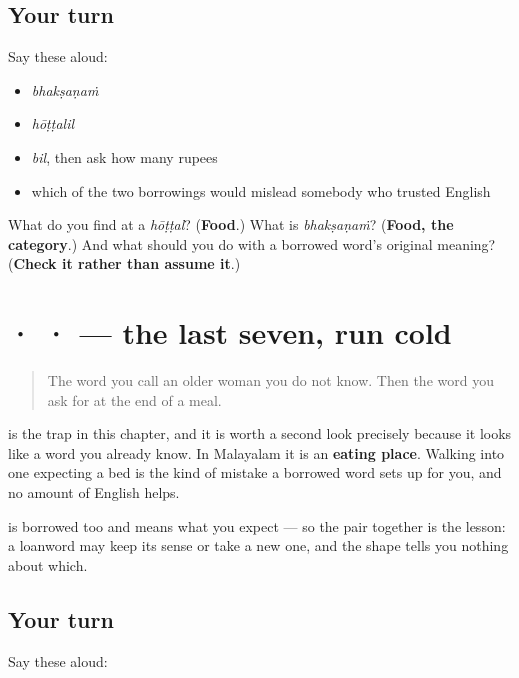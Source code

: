 \subsection*{Your turn}
Say these aloud:

\begin{itemize}
\raggedright
  \item \emph{bhakṣaṇaṁ}
  \item \emph{hōṭṭalil}
  \item \emph{bil}, then ask how many rupees
  \item which of the two borrowings would mislead somebody who trusted English
\end{itemize}

\begin{tcolorbox}[breakable,colback=teal!4,colframe=teal!35!black,title={Before you move on}]
What do you find at a \emph{hōṭṭal}? (\textbf{Food}.) What is \emph{bhakṣaṇaṁ}? (\textbf{Food, the category}.) And what should you do with a borrowed word's original meaning? (\textbf{Check it rather than assume it}.)
\end{tcolorbox}
\section[\texorpdfstring{\ml{ചേച്ചി} · \ml{ഹോട്ടൽ} … (chēchi · hōṭṭal …)}{ചേച്ചി · ഹോട്ടൽ … (chēchi · hōṭṭal …)}]{ ·  ·  — the last seven, run cold}

\label{lesson:ML-R92-the-last-seven}



\begin{quote}
The word you call an older woman you do not know. Then the word you ask for at the end of a meal.
\end{quote}

\begin{culture}
\textbf{} is the trap in this chapter, and it is worth a second look precisely because it looks like a word you already know. In Malayalam it is an \textbf{eating place}. Walking into one expecting a bed is the kind of mistake a borrowed word sets up for you, and no amount of English helps.

\textbf{} is borrowed too and means what you expect — so the pair together is the lesson: a loanword may keep its sense or take a new one, and the shape tells you nothing about which.
\end{culture}

\subsection*{Your turn}
Say these aloud:

